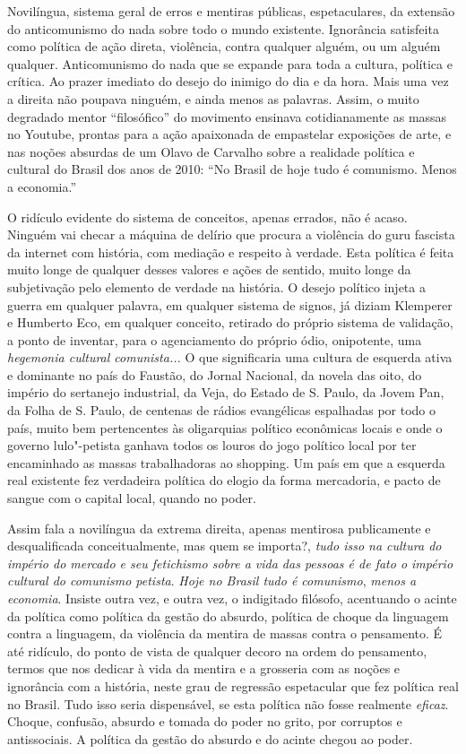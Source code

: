 Novilíngua, sistema geral de erros e mentiras públicas, espetaculares,
da extensão do anticomunismo do nada sobre todo o mundo existente.
Ignorância satisfeita como política de ação direta, violência, contra
qualquer alguém, ou um alguém qualquer. Anticomunismo do nada que se
expande para toda a cultura, política e crítica. Ao prazer imediato do
desejo do inimigo do dia e da hora. Mais uma vez a direita não poupava
ninguém, e ainda menos as palavras. Assim, o muito degradado mentor
``filosófico'' do movimento ensinava cotidianamente as massas no
Youtube, prontas para a ação apaixonada de empastelar exposições de
arte, e nas noções absurdas de um Olavo de Carvalho sobre a realidade
política e cultural do Brasil dos anos de 2010: ``No Brasil de hoje tudo
é comunismo. Menos a economia.''

O ridículo evidente do sistema de conceitos, apenas errados, não é
acaso. Ninguém vai checar a máquina de delírio que procura a violência
do guru fascista da internet com história, com mediação e respeito à
verdade. Esta política é feita muito longe de qualquer desses valores e
ações de sentido, muito longe da subjetivação pelo elemento de verdade
na história. O desejo político injeta a guerra em qualquer palavra, em
qualquer sistema de signos, já diziam Klemperer e Humberto Eco, em
qualquer conceito, retirado do próprio sistema de validação, a ponto de
inventar, para o agenciamento do próprio ódio, onipotente, uma
\emph{hegemonia cultural comunista...} O que significaria uma cultura de
esquerda ativa e dominante no país do Faustão, do Jornal Nacional, da
novela das oito, do império do sertanejo industrial, da Veja, do Estado
de S. Paulo, da Jovem Pan, da Folha de S. Paulo, de centenas de rádios
evangélicas espalhadas por todo o país, muito bem pertencentes às
oligarquias político econômicas locais e onde o governo lulo"-petista
ganhava todos os louros do jogo político local por ter encaminhado as
massas trabalhadoras ao shopping. Um país em que a esquerda real
existente fez verdadeira política do elogio da forma mercadoria, e pacto
de sangue com o capital local, quando no poder.

Assim fala a novilíngua da extrema direita, apenas mentirosa
publicamente e desqualificada conceitualmente, mas quem se importa?,
\emph{tudo isso na cultura do império do mercado e seu fetichismo sobre
a vida das pessoas é de fato o império cultural do comunismo petista}.
\emph{Hoje no Brasil tudo é comunismo}, \emph{menos a economia}. Insiste
outra vez, e outra vez, o indigitado filósofo, acentuando o acinte da
política como política da gestão do absurdo, política de choque da
linguagem contra a linguagem, da violência da mentira de massas contra o
pensamento. É até ridículo, do ponto de vista de qualquer decoro na
ordem do pensamento, termos que nos dedicar à vida da mentira e a
grosseria com as noções e ignorância com a história, neste grau de
regressão espetacular que fez política real no Brasil. Tudo isso seria
dispensável, se esta política não fosse realmente \emph{eficaz}. Choque,
confusão, absurdo e tomada do poder no grito, por corruptos e
antissociais. A política da gestão do absurdo e do acinte chegou ao
poder.

